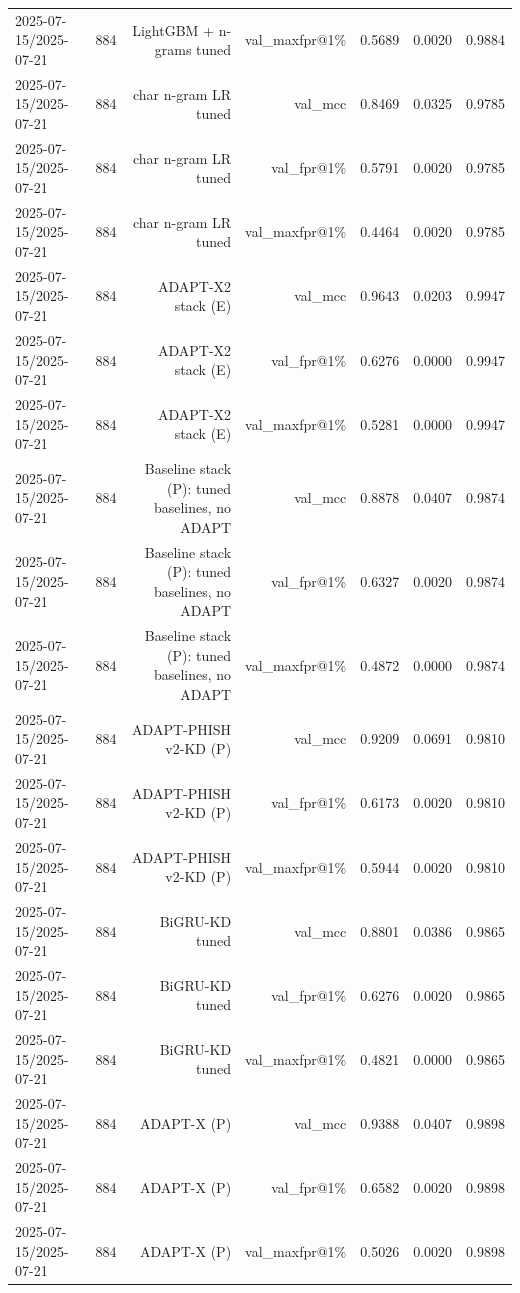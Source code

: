 \begin{table}[t]
\begin{tabular}{llrrrrr}
2025-07-15/2025-07-21 & 884 & LightGBM + n-grams tuned & val\_maxfpr@1\% & 0.5689 & 0.0020 & 0.9884 \\
2025-07-15/2025-07-21 & 884 & char n-gram LR tuned & val\_mcc & 0.8469 & 0.0325 & 0.9785 \\
2025-07-15/2025-07-21 & 884 & char n-gram LR tuned & val\_fpr@1\% & 0.5791 & 0.0020 & 0.9785 \\
2025-07-15/2025-07-21 & 884 & char n-gram LR tuned & val\_maxfpr@1\% & 0.4464 & 0.0020 & 0.9785 \\
2025-07-15/2025-07-21 & 884 & ADAPT-X2 stack (E) & val\_mcc & 0.9643 & 0.0203 & 0.9947 \\
2025-07-15/2025-07-21 & 884 & ADAPT-X2 stack (E) & val\_fpr@1\% & 0.6276 & 0.0000 & 0.9947 \\
2025-07-15/2025-07-21 & 884 & ADAPT-X2 stack (E) & val\_maxfpr@1\% & 0.5281 & 0.0000 & 0.9947 \\
2025-07-15/2025-07-21 & 884 & Baseline stack (P): tuned baselines, no ADAPT & val\_mcc & 0.8878 & 0.0407 & 0.9874 \\
2025-07-15/2025-07-21 & 884 & Baseline stack (P): tuned baselines, no ADAPT & val\_fpr@1\% & 0.6327 & 0.0020 & 0.9874 \\
2025-07-15/2025-07-21 & 884 & Baseline stack (P): tuned baselines, no ADAPT & val\_maxfpr@1\% & 0.4872 & 0.0000 & 0.9874 \\
2025-07-15/2025-07-21 & 884 & ADAPT-PHISH v2-KD (P) & val\_mcc & 0.9209 & 0.0691 & 0.9810 \\
2025-07-15/2025-07-21 & 884 & ADAPT-PHISH v2-KD (P) & val\_fpr@1\% & 0.6173 & 0.0020 & 0.9810 \\
2025-07-15/2025-07-21 & 884 & ADAPT-PHISH v2-KD (P) & val\_maxfpr@1\% & 0.5944 & 0.0020 & 0.9810 \\
2025-07-15/2025-07-21 & 884 & BiGRU-KD tuned & val\_mcc & 0.8801 & 0.0386 & 0.9865 \\
2025-07-15/2025-07-21 & 884 & BiGRU-KD tuned & val\_fpr@1\% & 0.6276 & 0.0020 & 0.9865 \\
2025-07-15/2025-07-21 & 884 & BiGRU-KD tuned & val\_maxfpr@1\% & 0.4821 & 0.0000 & 0.9865 \\
2025-07-15/2025-07-21 & 884 & ADAPT-X (P) & val\_mcc & 0.9388 & 0.0407 & 0.9898 \\
2025-07-15/2025-07-21 & 884 & ADAPT-X (P) & val\_fpr@1\% & 0.6582 & 0.0020 & 0.9898 \\
2025-07-15/2025-07-21 & 884 & ADAPT-X (P) & val\_maxfpr@1\% & 0.5026 & 0.0020 & 0.9898 \\

\end{tabular}
\end{table}
